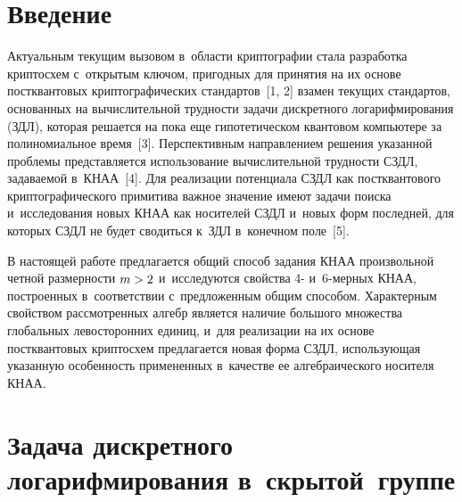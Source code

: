 
  



\thispagestyle{headings}

\begin{multicols}{2}

\label{st\stat}

\section{Введение}

  Актуальным текущим вызовом в~области крип\-то\-гра\-фии стала разработка 
криптосхем с~открытым ключом, пригодных для принятия на их основе 
постквантовых криптографических стандартов~[1, 2] взамен текущих 
стандартов, основанных на вычислительной трудности задачи дискретного 
логарифмирования (ЗДЛ), которая решается на пока еще гипотетическом 
квантовом компьютере за полиномиальное время~[3]. Перспективным 
на\-прав\-ле\-ни\-ем решения указанной проб\-ле\-мы пред\-став\-ля\-ет\-ся использование 
вычислительной трудности СЗДЛ, за\-да\-ва\-емой в~КНАА~[4]. Для реализации 
потенциала СЗДЛ как постквантового криптографического примитива важное 
значение имеют задачи поиска и~исследования новых КНАА как носителей 
СЗДЛ и~новых форм последней, для которых СЗДЛ не будет сводиться к~ЗДЛ 
в~конечном поле~[5]. 
  
  В настоящей работе предлагается общий способ задания КНАА 
  произвольной четной 
размерности $m\hm> 2$ и~исследуются свойства 4- и~6-мер\-ных 
КНАА, построенных в~соответствии с~предложенным общим способом. 
Характерным свойством рас\-смот\-рен\-ных алгебр является наличие большого 
множества глобальных левосторонних единиц, и~для реализации на их основе 
постквантовых криптосхем предлагается новая форма СЗДЛ, использующая 
указанную особенность примененных в~качестве ее алгебраического носителя 
КНАА.
  
\section{Задача дискретного логарифмирования в~скрытой~группе}


\end{multicols}
